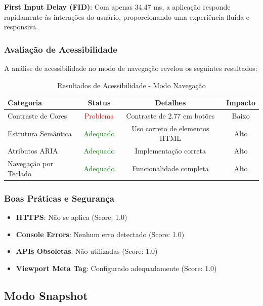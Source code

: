 \textbf{First Input Delay (FID)}: Com apenas 34.47 ms, a aplicação responde rapidamente às interações do usuário, proporcionando uma experiência fluida e responsiva.

\subsubsection{Avaliação de Acessibilidade}

A análise de acessibilidade no modo de navegação revelou os seguintes resultados:

\begin{table}[h]
\centering
\caption{Resultados de Acessibilidade - Modo Navegação}
\begin{tabular}{|l|c|c|c|}
\hline
\textbf{Categoria} & \textbf{Status} & \textbf{Detalhes} & \textbf{Impacto} \\
\hline
Contraste de Cores & \textcolor{red}{Problema} & Contraste de 2.77 em botões & Baixo \\
\hline
Estrutura Semântica & \textcolor{green}{Adequado} & Uso correto de elementos HTML & Alto \\
\hline
Atributos ARIA & \textcolor{green}{Adequado} & Implementação correta & Alto \\
\hline
Navegação por Teclado & \textcolor{green}{Adequado} & Funcionalidade completa & Alto \\
\hline
\end{tabular}
\end{table}

\subsubsection{Boas Práticas e Segurança}

\begin{itemize}
    \item \textbf{HTTPS}: Não se aplica (Score: 1.0)
    \item \textbf{Console Errors}: Nenhum erro detectado (Score: 1.0)
    \item \textbf{APIs Obsoletas}: Não utilizadas (Score: 1.0)
    \item \textbf{Viewport Meta Tag}: Configurado adequadamente (Score: 1.0)
\end{itemize}

\subsection{Modo Snapshot}

